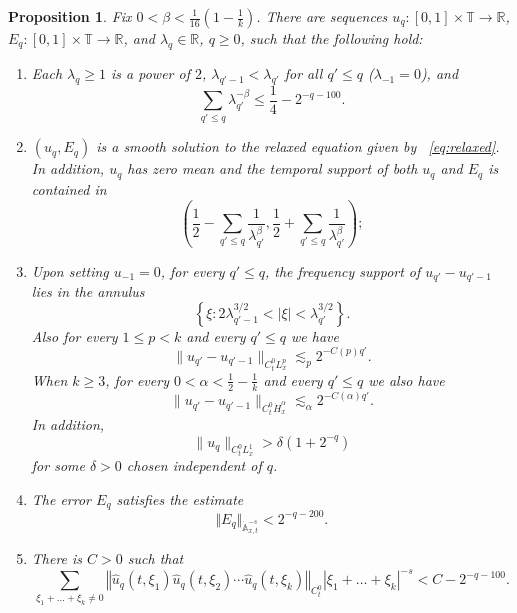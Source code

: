 \documentclass[12pt,reqno,letterpaper]{amsart}
\numberwithin{equation}{section}
\newcommand{\1}{{\bf 1}}
\newcommand{\2}{{\bf 2}}
\newcommand{\R}{\mathbb R}
\newcommand{\T}{\mathbb T}
\newcommand{\norm}[1]{ \Vert #1 \Vert}
\newtheorem{proposition}[theorem]{Proposition}
\theoremstyle{remark}
\theoremstyle{remark}
\begin{document}
\begin{proposition}\label{prop:ind}
    Fix $0 < \beta < \frac{1}{16}\left(1 - \frac{1}{k}\right)$. There are sequences $u_q:[0,1] \times \T \to \R$, $E_q : [0,1] \times \T \to \R$, and $\lambda_q \in \R$, $q \geq 0$, such that the following hold:
    \begin{enumerate}
        \item\label{i:1} Each $\lambda_q \geq 1$ is a power of $2$, $\lambda_{q'-1} < \lambda_{q'}$ for all $q' \leq q$ ($\lambda_{-1}=0$), and
        $$
        \sum_{q' \leq q}\lambda_{q'}^{-\beta} \leq \frac{1}{4} - 2^{-q-100}.
        $$
        \item\label{i:2} $(u_q,E_q)$ is a smooth solution to the relaxed equation given by ~\eqref{eq:relaxed}. In addition, $u_q$ has zero mean and the temporal support of both $u_q$ and $E_q$ is contained in
        $$
        \left(\frac{1}{2}- \sum_{q'\leq q} \frac{1}{\lambda_{q'}^\beta},\frac{1}{2} + \sum_{q' \leq q} \frac{1}{\lambda_{q'}^\beta}\right);
        $$
        \item\label{i:3} Upon setting $u_{-1}=0$, for every $q' \leq q$, the frequency support of $u_{q'} - u_{q'-1}$ lies in the annulus
        $$
        \left\{\xi : 2\lambda_{q'-1}^{3/2} < |\xi| < \lambda_{q'}^{3/2}\right\}.
        $$
        Also for every $1\le p<k$ and every
$q'\le q$ we have
\[
    \|u_{q'}-u_{q'-1}\|_{C_t^0L_x^p}
    \lesssim_p
    2^{-C(p)q'}.
\]
When $k\ge3$, for every $0<\alpha<\frac12-\frac1k$ and every $q'\le q$ we also
have
\[
    \|u_{q'}-u_{q'-1}\|_{C_t^0\dot H_x^\alpha}
    \lesssim_\alpha
    2^{-C(\alpha)q'}.
\]
In addition,
\[
    \|u_q\|_{C_t^0L_x^1}>\delta(1+2^{-q})
\]
for some $\delta>0$ chosen independent of $q$.
\item\label{i:4} The error $E_q$ satisfies the estimate
        \[
        \norm{E_q}_{\dot{\mathbb{A}}_{x,t}^{-s}} < 2^{-q-200}.
        \]
        \item\label{i:5} There is $C>0$ such that
        $$
        \sum_{\xi_1 + \ldots + \xi_k \not = 0} \left\Vert  \hat{u}_{q}(t,\xi_1) \hat{u}_{q}(t,\xi_2) \cdots \hat{u}_{q}(t,\xi_k) \right\Vert_{C_t^0}|\xi_1 + \ldots + \xi_k|^{-s} < C - 2^{-q-100}.
        $$
    \end{enumerate}
\end{proposition}
\end{document}
